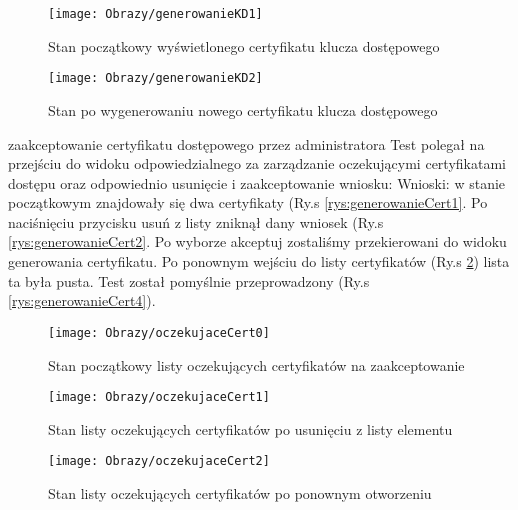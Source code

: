 \begin{enumerate*}
	
	\begin{figure}[ht!]
		
		\begin{minipage}{0.4\textwidth}
			\texttt{[image: Obrazy/generowanieKD1]}
			\caption{Stan początkowy wyświetlonego certyfikatu klucza dostępowego }
			\label{rys:generowanieKD1}
		\end{minipage}
		\begin{minipage}{0.4\textwidth}
			\texttt{[image: Obrazy/generowanieKD2]}
			\caption{Stan po wygenerowaniu nowego certyfikatu klucza dostępowego}
			\label{rys:generowanieKD2}
		\end{minipage}
		
	
	\end{figure}
	
	
	\item  zaakceptowanie certyfikatu dostępowego przez administratora
	Test polegał na przejściu do widoku odpowiedzialnego za zarządzanie oczekującymi certyfikatami dostępu oraz odpowiednio usunięcie i zaakceptowanie wniosku:
	Wnioski: w stanie początkowym znajdowały się dwa certyfikaty (Ry.s \ref{rys:generowanieCert1}. Po naciśnięciu przycisku usuń z listy zniknął dany wniosek (Ry.s \ref{rys:generowanieCert2}. Po wyborze akceptuj zostaliśmy przekierowani do widoku generowania certyfikatu. Po ponownym wejściu do listy certyfikatów (Ry.s \ref{rys:generowanieCert3}) lista ta była pusta. Test został pomyślnie przeprowadzony (Ry.s \ref{rys:generowanieCert4}). 
	
		\begin{figure}[ht!]
		
		\begin{minipage}{0.2\textwidth}
			\texttt{[image: Obrazy/oczekujaceCert0]}
			\caption{Stan początkowy listy oczekujących certyfikatów na zaakceptowanie }
			\label{rys:generowanieCert1}
		\end{minipage}
		\begin{minipage}{0.2\textwidth}
			\texttt{[image: Obrazy/oczekujaceCert1]}
			\caption{Stan listy oczekujących certyfikatów po usunięciu z listy elementu}
			\label{rys:generowanieCert2}
		\end{minipage}
		
		\begin{minipage}{0.2\textwidth}
			\texttt{[image: Obrazy/oczekujaceCert2]}
			\caption{Stan listy oczekujących certyfikatów po ponownym otworzeniu}
			\label{rys:generowanieCert3}
		\end{minipage}
	

\end{figure}
\end{enumerate*}
